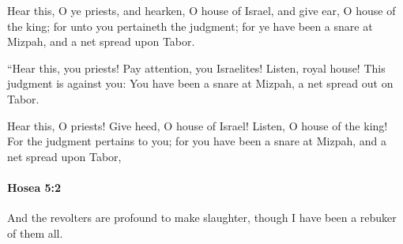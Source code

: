			\begin{versebox}
					\item[BHS] 
					\item[LXX] 
					\item[ASV] Hear this, O ye priests, and hearken, O house of Israel, and give ear, O house of the king; for unto you pertaineth the judgment; for ye have been a snare at Mizpah, and a net spread upon Tabor.
					\item[NIV] “Hear this, you priests! Pay attention, you Israelites! Listen, royal house! This judgment is against you: You have been a snare at Mizpah, a net spread out on Tabor.
					\item[NRSV] Hear this, O priests! Give heed, O house of Israel! Listen, O house of the king! For the judgment pertains to you; for you have been a snare at Mizpah, and a net spread upon Tabor,
			\end{versebox}

		\paragraph{Hosea 5:2} %
			\label{HOSEA-5-2}

			And the revolters are profound to make slaughter, though I have been a rebuker of them all.

